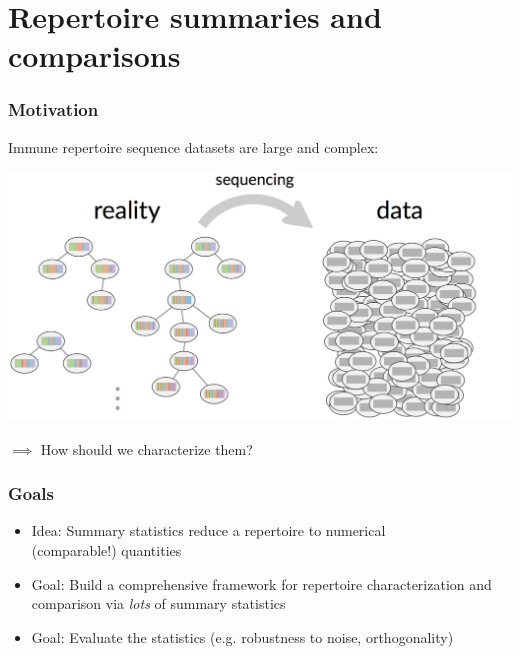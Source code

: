 \documentclass[mathserif,compress]{beamer}
\renewcommand\;{\,}
\begin{document}
\section{Repertoire summaries and comparisons}

\begin{frame}\frametitle{Motivation}
Immune repertoire sequence datasets are large and complex:
\begin{center}
\includegraphics[width=\linewidth]{Images/reality-data.png}
\end{center}
$\implies$ How should we characterize them?
\end{frame}

\begin{frame}\frametitle{Goals}
\begin{itemize}
\item
Idea: Summary statistics reduce a repertoire to numerical \\ (comparable!) quantities
\bigskip
\item
Goal: Build a comprehensive framework for repertoire characterization and comparison via \emph{lots} of summary statistics
\bigskip
\item
Goal: Evaluate the statistics (e.g. robustness to noise, orthogonality) 
\end{itemize}
\end{frame}
\end{document}
